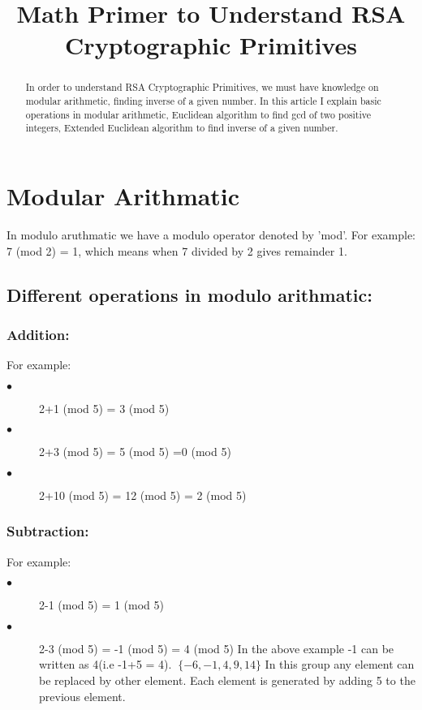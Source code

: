 \documentclass{article}
\title{Math Primer to Understand RSA Cryptographic Primitives}
\author{}
\begin{document}
	\maketitle
	\begin{abstract}
		In order to understand  RSA Cryptographic Primitives, we must have knowledge on modular arithmetic, finding inverse of a given number. In this article I explain basic operations in modular arithmetic, Euclidean algorithm to find  gcd of two positive integers, Extended Euclidean algorithm to find inverse of a given number.
		
	\end{abstract}
	
	\section{Modular Arithmatic}
	In modulo aruthmatic we have a modulo operator denoted by 'mod'.
	For example: 7 (mod 2) = 1, which means when 7 divided by 2 gives remainder 1.
	\subsection{Different operations in modulo arithmatic:}
	\subsubsection{Addition:}
	For example:
	   \begin{description}
	   \item[$ \bullet$] 2+1 (mod 5) = 3 (mod 5)
	   \item[$ \bullet$] 2+3 (mod 5) = 5 (mod 5) =0 (mod 5)
	   \item[$\bullet$]  2+10 (mod 5) = 12 (mod 5) = 2 (mod 5)
	    \end{description}
    \subsubsection{Subtraction:}
    For example:
     \begin{description}
    	\item[$ \bullet$] 2-1 (mod 5) = 1 (mod 5)
    	\item[$ \bullet$] 2-3 (mod 5) = -1 (mod 5) = 4 (mod 5)
    	In the above example -1 can be written as 4(i.e -1+5 = 4).
    	$ \ {\{-6, -1, 4, 9, 14 }\} $ In this group any element can be replaced by other element. Each element is generated by adding 5 to the previous element.
    \end{description}
\end{document}
